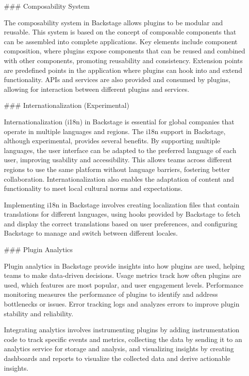 ### Composability System

The composability system in Backstage allows plugins to be modular and reusable. This system is based on the concept of composable components that can be assembled into complete applications. Key elements include component composition, where plugins expose components that can be reused and combined with other components, promoting reusability and consistency. Extension points are predefined points in the application where plugins can hook into and extend functionality. APIs and services are also provided and consumed by plugins, allowing for interaction between different plugins and services.

### Internationalization (Experimental)

Internationalization (i18n) in Backstage is essential for global companies that operate in multiple languages and regions. The i18n support in Backstage, although experimental, provides several benefits. By supporting multiple languages, the user interface can be adapted to the preferred language of each user, improving usability and accessibility. This allows teams across different regions to use the same platform without language barriers, fostering better collaboration. Internationalization also enables the adaptation of content and functionality to meet local cultural norms and expectations.

Implementing i18n in Backstage involves creating localization files that contain translations for different languages, using hooks provided by Backstage to fetch and display the correct translations based on user preferences, and configuring Backstage to manage and switch between different locales.

### Plugin Analytics

Plugin analytics in Backstage provide insights into how plugins are used, helping teams to make data-driven decisions. Usage metrics track how often plugins are used, which features are most popular, and user engagement levels. Performance monitoring measures the performance of plugins to identify and address bottlenecks or issues. Error tracking logs and analyzes errors to improve plugin stability and reliability.

Integrating analytics involves instrumenting plugins by adding instrumentation code to track specific events and metrics, collecting the data by sending it to an analytics service for storage and analysis, and visualizing insights by creating dashboards and reports to visualize the collected data and derive actionable insights.

